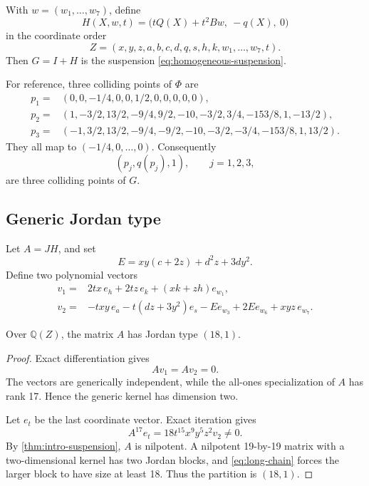 \documentclass[11pt,reqno]{amsart}
\begin{document}
With \(w=(w_1,\ldots,w_7)\), define
\begin{equation}
\label{eq:H19}
H(X,w,t)=
\bigl(tQ(X)+t^2Bw,\ -q(X),\ 0\bigr)
\end{equation}
in the coordinate order
\[
Z=(x,y,z,a,b,c,d,q,s,h,k,w_1,\ldots,w_7,t).
\]
Then \(G=I+H\) is the suspension \eqref{eq:homogeneous-suspension}.

For reference, three colliding points of \(\Phi\) are
\begin{align*}
p_1={}&(0,0,-1/4,0,0,1/2,0,0,0,0,0),\\
p_2={}&(1,-3/2,13/2,-9/4,9/2,-10,-3/2,3/4,-153/8,1,-13/2),\\
p_3={}&(-1,3/2,13/2,-9/4,-9/2,-10,-3/2,-3/4,-153/8,1,13/2).
\end{align*}
They all map to \((-1/4,0,\ldots,0)\).  Consequently
\[
(p_j,q(p_j),1),\qquad j=1,2,3,
\]
are three colliding points of \(G\).

\subsection{Generic Jordan type}

Let \(A=JH\), and set
\[
E=xy(c+2z)+d^2z+3dy^2.
\]
Define two polynomial vectors
\begin{align}
v_1={}&2tx\,e_h+2tz\,e_k+(xk+zh)e_{w_1},
\label{eq:v1}\\
v_2={}&-txy\,e_a-t(dz+3y^2)e_s-Ee_{w_3}
       +2Ee_{w_6}+xyz\,e_{w_7}.
\label{eq:v2}
\end{align}

\begin{proposition}
\label{prop:jordan19}
Over \(\mathbb Q(Z)\), the matrix \(A\) has Jordan type \((18,1)\).
\end{proposition}

\begin{proof}
Exact differentiation gives
\[
Av_1=Av_2=0.
\]
The vectors are generically independent, while the all-ones specialization
of \(A\) has rank 17.  Hence the generic kernel has dimension two.

Let \(e_t\) be the last coordinate vector.  Exact iteration gives
\begin{equation}
\label{eq:long-chain}
A^{17}e_t=18t^{15}x^9y^5z^2v_2\ne0.
\end{equation}
By \cref{thm:intro-suspension}, \(A\) is nilpotent.  A nilpotent
19-by-19 matrix with a two-dimensional kernel has two Jordan blocks, and
\eqref{eq:long-chain} forces the larger block to have size at least 18.
Thus the partition is \((18,1)\).
\end{proof}
\end{document}

